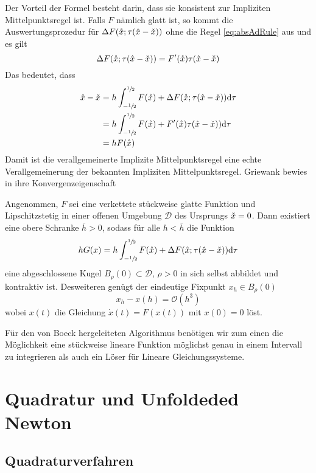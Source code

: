 Der Vorteil der Formel besteht darin, dass sie konsistent zur Impliziten Mittelpunktsregel ist. Falls $F$ nämlich glatt ist, so kommt die Auswertungsprozedur für $\Delta F(\mathring{x};\tau (\hat{x} - \check{x}))$ ohne die Regel \eqref{eq:absAdRule} aus und es gilt 
\[
 \Delta F(\mathring{x};\tau (\hat{x} - \check{x})) = F'(\mathring{x}) \tau (\hat{x} - \check{x})
\]
Das bedeutet, dass
\[
\begin{aligned}
   \hat{x} -  \check{x} &= h\int_{-\sfrac{1}{2}}^{\sfrac{1}{2}} F(\mathring{x}) + \Delta F(\mathring{x};\tau (\hat{x} - \check{x}))  \text{d}\tau\\
		    &= h\int_{-\sfrac{1}{2}}^{\sfrac{1}{2}} F(\mathring{x}) + F'(\mathring{x})\tau (\hat{x} - \check{x}))  \text{d}\tau\\
		    &= h F(\mathring{x})
\end{aligned}
\]
Damit ist die verallgemeinerte Implizite Mittelpunktsregel eine echte Verallgemeinerung der bekannten Impliziten Mittelpunktsregel. 
Griewank bewies in \cite[Prop.4]{monster} ihre Konvergenzeigenschaft
\begin{theorem}
 Angenommen, $F$ sei eine verkettete stückweise glatte Funktion und Lipschitzstetig in einer offenen Umgebung $\mathcal D$ des Ursprungs $\check{x} =0$. Dann existiert eine obere Schranke $\bar h>0$, sodass für alle $h<\bar h$ die Funktion 
 \[
    hG(x) = h\int_{-\sfrac{1}{2}}^{\sfrac{1}{2}} F(\mathring{x}) + \Delta F(\mathring{x};\tau (\hat{x} - \check{x}))  \text{d}\tau
 \] 
 eine abgeschlossene Kugel $B_\rho(0)\subset \mathcal D$, $\rho>0$ in sich selbst abbildet und kontraktiv ist.
 Desweiteren genügt der eindeutige Fixpunkt $x_h\in B_\rho(0)$
 \[
  x_h - x(h) = \mathcal O(h^3)
 \]
  wobei $x(t)$ die Gleichung $\dot x(t) = F(x(t))$ mit  $x(0)= 0$ löst.
\end{theorem}

Für den von Boeck \cite{boeck14} hergeleiteten Algorithmus benötigen wir zum einen die Möglichkeit eine stückweise lineare Funktion möglichst genau in einem Intervall zu integrieren als auch ein Löser für Lineare Gleichungssysteme.

\section{Quadratur und Unfoldeded Newton}
\subsection{Quadraturverfahren}

